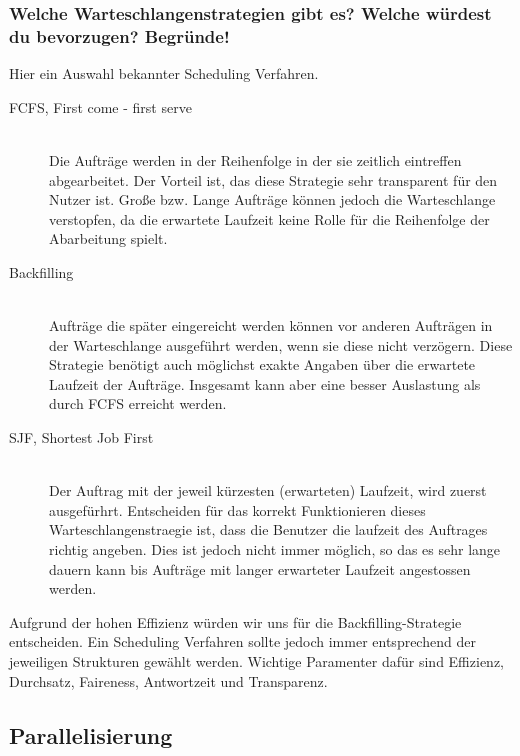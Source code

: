 	\subsubsection{Welche Warteschlangenstrategien gibt es? Welche w\"urdest du bevorzugen? Begr\"unde!}
	Hier ein Auswahl bekannter Scheduling Verfahren.
	\begin{description}
		\item[FCFS, First come - first serve] \hfill \\
			Die Auftr\"age werden in der Reihenfolge in der sie zeitlich eintreffen abgearbeitet.
			Der Vorteil ist, das diese Strategie sehr transparent f\"ur den Nutzer ist.
			Große bzw. Lange Auftr\"age k\"onnen jedoch die Warteschlange verstopfen,
			da die erwartete Laufzeit keine Rolle f\"ur die Reihenfolge der Abarbeitung spielt.
		\item[Backfilling] \hfill \\
			Auftr\"age die sp\"ater eingereicht werden k\"onnen vor anderen Auftr\"agen in der
			Warteschlange ausgef\"uhrt werden, wenn sie diese nicht verz\"ogern.
			Diese Strategie ben\"otigt auch m\"oglichst exakte Angaben \"uber die erwartete Laufzeit
			der Auftr\"age.
			Insgesamt kann aber eine besser Auslastung als durch FCFS erreicht werden.	
		\item[SJF, Shortest Job First] \hfill \\
			Der Auftrag mit der jeweil k\"urzesten (erwarteten) Laufzeit, wird zuerst ausgef\"urhrt.
			Entscheiden f\"ur das korrekt Funktionieren dieses Warteschlangenstraegie ist,
			dass die Benutzer die laufzeit des Auftrages richtig angeben.
			Dies ist jedoch nicht immer m\"oglich,
			so das es sehr lange dauern kann bis Auftr\"age mit langer erwarteter Laufzeit angestossen werden.
	\end{description}
	Aufgrund der hohen Effizienz w\"urden wir uns für die Backfilling-Strategie entscheiden.
	Ein Scheduling Verfahren sollte jedoch immer entsprechend der jeweiligen Strukturen gewählt werden.
	Wichtige Paramenter dafür sind Effizienz, Durchsatz, Faireness, Antwortzeit und Transparenz.
\subsection{Parallelisierung}

